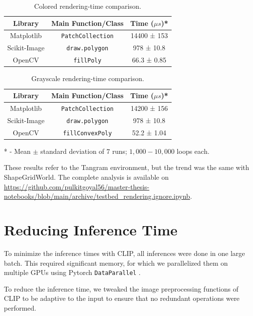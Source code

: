\begin{table}[H]
    \centering
    \begin{tabular}[t]{@{} c c c @{}}
        \hline
        \textbf{Library} & \textbf{Main Function/Class} & \textbf{Time (\(\mu s\))*}\\
        \hline
        Matplotlib & \texttt{PatchCollection} & 14400 ± 153\\
        Scikit-Image & \texttt{draw.polygon} & 978 ± 10.8\\
        OpenCV & \texttt{fillPoly} & 66.3 ± 0.85\\
        \hline
    \end{tabular}
    \caption{Colored rendering-time comparison.}
    \label{tab:render-time-color}
\end{table}
\begin{table}[H]
    \centering
    \begin{tabular}[t]{@{} c c c @{}}
        \hline
        \textbf{Library} & \textbf{Main Function/Class} & \textbf{Time (\(\mu s\))*}\\
        \hline
        Matplotlib & \texttt{PatchCollection} & 14200 ± 156\\
        Scikit-Image & \texttt{draw.polygon} & 978 ± 10.8\\
        OpenCV & \texttt{fillConvexPoly} & 52.2 ± 1.04\\
        \hline
    \end{tabular}
    \caption{Grayscale rendering-time comparison.}
    \label{tab:render-time-bw}
\end{table}
* - Mean \(\pm\) standard deviation of \(7\) runs; \(1,000 - 10,000\) loops each.

These results refer to the Tangram environment, but the trend was the same with ShapeGridWorld.
The complete analysis is available on \url{https://github.com/pulkitgoyal56/master-thesis-notebooks/blob/main/archive/testbed_rendering.ignore.ipynb}.

\section{Reducing Inference Time}
\label{sec:improving-infer}
To minimize the inference times with CLIP, all inferences were done in one large batch.
This required significant memory, for which we parallelized them on multiple GPUs using Pytorch \texttt{DataParallel} \citep{pytorch}.

To reduce the inference time, we tweaked the image preprocessing functions of CLIP to be adaptive to the input to ensure that no redundant operations were performed.

